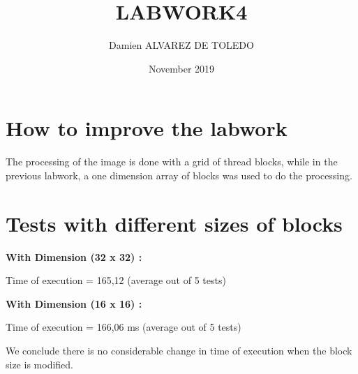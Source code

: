 \documentclass{article}
\title{LABWORK4}
\author{Damien ALVAREZ DE TOLEDO }
\date{November 2019}
\begin{document}
\maketitle

\section{How to improve the labwork} \newline

The processing of the image is done with a grid of thread blocks, while in the previous labwork, a one dimension array of blocks was used to do the processing.

\section{Tests with different sizes of blocks} \newline

\textbf{With Dimension (32 x 32) :} \newline 

Time of execution = 165,12 (average out of 5 tests) \newline

\textbf{With Dimension (16 x 16) :} \newline 

Time of execution = 166,06 ms (average out of 5 tests) \newline

We conclude there is no considerable change in time of execution when the block size is modified. \newline 
\end{document}
